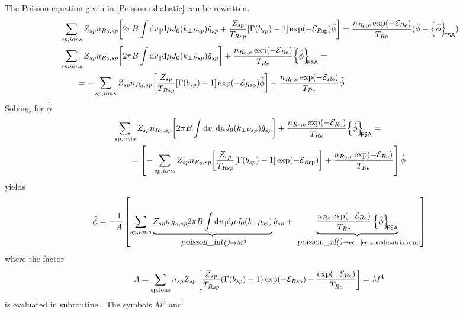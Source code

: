 The Poisson equation given in \ref{Poisson-adiabatic} can be rewritten.
\ifmoredetails
\begin{align}
  &\sum_{sp , ions }  Z_{sp} n_{R_0,sp} \biggl [ 
  2 \pi B \int {\rm d} v_{\parallel} {\rm d} \mu J_0(k_\perp\rho_{sp}) \hat g_{sp} + {Z_{sp} \over T_{Rsp}} [ \Gamma(b_{sp}) -1]\exp(-\mathcal{E}_{R{\rm sp}}) \hat \phi 
  \biggr ] =  { n_{R_0,e}\exp(-\mathcal{E}_{R{\rm e}})
    \over T_{Re}} ( \hat \phi - {\left\{ \hat \phi \right\}_{\!\!\text{\textsf{FSA}}}}) \nonumber\\
  &
  \sum_{sp , ions }  Z_{sp} n_{R_0,sp} \biggl [ 
  2 \pi B \int {\rm d} v_{\parallel} {\rm d} \mu J_0(k_\perp\rho_{sp}) \hat g_{sp}
  \biggr ]
  + { n_{R_0,e}\exp(-\mathcal{E}_{R{\rm e}}) \over T_{Re}} {\left\{ \hat \phi \right\}_{\!\!\text{\textsf{FSA}}}} 
  = {} \nonumber\\
  &\qquad {} = 
  -\sum_{sp , ions }  Z_{sp} n_{R_0,sp} \biggl [ 
  {Z_{sp} \over T_{Rsp}} [ \Gamma(b_{sp}) -1]\exp(-\mathcal{E}_{R{\rm sp}}) \hat \phi 
  \biggr ]
  + { n_{R_0,e}\exp(-\mathcal{E}_{R{\rm e}}) \over T_{Re}} \hat \phi
 \nonumber\\
\end{align}
Solving for $\hat\phi$
\begin{align}
  &
  \sum_{sp , ions }  Z_{sp} n_{R_0,sp} \biggl [ 
  2 \pi B \int {\rm d} v_{\parallel} {\rm d} \mu J_0(k_\perp\rho_{sp}) \hat g_{sp}
  \biggr ]
  + { n_{R_0,e}\exp(-\mathcal{E}_{R{\rm e}}) \over T_{Re}} {\left\{  \hat\phi\right\}_{\!\!\text{\textsf{FSA}}}} 
  = {} \nonumber\\
  &\qquad {} = 
  \left[-\sum_{sp , ions }  Z_{sp} n_{R_0,sp} \biggl [ 
  {Z_{sp} \over T_{Rsp}} [ \Gamma(b_{sp}) -1]\exp(-\mathcal{E}_{R{\rm sp}})
  \biggr ]
  + { n_{R_0,e}\exp(-\mathcal{E}_{R{\rm e}}) \over T_{Re}} \right] \hat \phi
 \nonumber\\
\end{align}
yields
\fi
\begin{align}
\hat{\phi }= -{1 \over A} \left[ \sum_{sp , ions }  \underbrace{Z_{sp} n_{R_0,sp} 2 \pi B \int {\rm d} v_{\parallel} {\rm d} \mu J_0(k_\perp\rho_{sp})}_{\name{poisson_int()}\rightarrow M^3} \hat g_{sp} + \underbrace{{n_{Re}\exp(-\cfennsp{e}) \over T_{Re}}
 \fsa{\hat\phi}}_{\name{poisson_zf()}\rightarrow \text{eq. \ref{eq:zonalmatrixform}}}
\right]
\label{eq:poisson2}
\end{align}
where the factor
\begin{equation}
 A =  \sum_{\rm sp, ions} n_{sp} Z_{sp} \left[ {Z_{sp} \over T_{Rsp}} ( \Gamma(b_{sp}) -1)\exp(-\mathcal{E}_{R{\rm sp}}) - {\exp(-\mathcal{E}_{R{\rm e}}) \over T_{Re} } \right] = M^4
\end{equation}
is evaluated in subroutine . The symbols $M^3$ and
